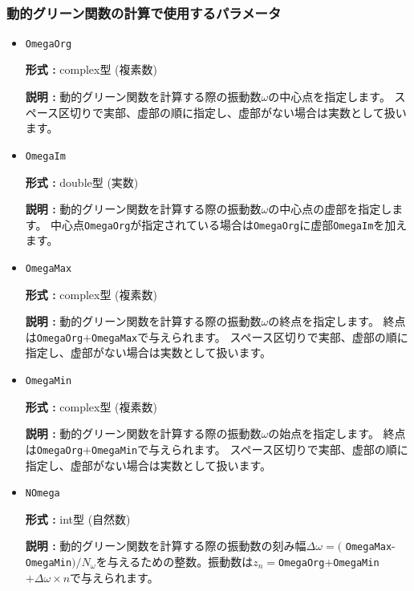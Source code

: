 ~\subsubsection{動的グリーン関数の計算で使用するパラメータ}

\begin{itemize}    
\item \verb|OmegaOrg|

{\bf 形式 :} complex型 (複素数)

{\bf 説明 :} {動的グリーン関数を計算する際の振動数$\omega$の中心点を指定します。
スペース区切りで実部、虚部の順に指定し、虚部がない場合は実数として扱います。}

\item \verb|OmegaIm|

{\bf 形式 :} double型 (実数)

{\bf 説明 :} {動的グリーン関数を計算する際の振動数$\omega$の中心点の虚部を指定します。
中心点\verb|OmegaOrg|が指定されている場合は\verb|OmegaOrg|に虚部\verb|OmegaIm|を加えます。}

\item \verb|OmegaMax|

{\bf 形式 :} complex型 (複素数)

{\bf 説明 :} {動的グリーン関数を計算する際の振動数$\omega$の終点を指定します。
終点は\verb|OmegaOrg|$+$\verb|OmegaMax|で与えられます。
スペース区切りで実部、虚部の順に指定し、虚部がない場合は実数として扱います。}

\item \verb|OmegaMin|

{\bf 形式 :} complex型 (複素数)

{\bf 説明 :} {動的グリーン関数を計算する際の振動数$\omega$の始点を指定します。
終点は\verb|OmegaOrg|$+$\verb|OmegaMin|で与えられます。
スペース区切りで実部、虚部の順に指定し、虚部がない場合は実数として扱います。}
 
\item \verb|NOmega|

{\bf 形式 :} int型 (自然数)

{\bf 説明 :} {動的グリーン関数を計算する際の振動数の刻み幅$\Delta \omega = ($ \verb|OmegaMax|- \verb|OmegaMin|$)/N_{\omega}$を与えるための整数。振動数は$z_n=$\verb|OmegaOrg|$+$\verb|OmegaMin|$+ \Delta \omega \times n$で与えられます。} 
 \end{itemize}

